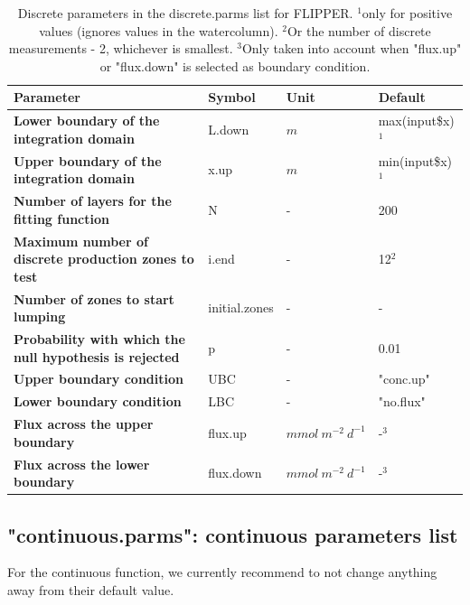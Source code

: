 \documentclass[10pt]{article}
\begin{document}
\begin{table}[!h]
	\small
	\caption{Discrete parameters in the discrete.parms list for FLIPPER. $^{1}$only for positive values (ignores values in the watercolumn). $^{2}$Or the number of discrete measurements - 2, whichever is smallest. $^{3}$Only taken into account when "flux.up" or "flux.down" is selected as boundary condition.}
	\begin{tabular}{p{8cm} p{1.5cm} p{2cm} p{2cm}}
		\hline
		\textbf{Parameter} & \textbf{Symbol} & \textbf{Unit} & \textbf{Default} \\     
		 \hline
		\textbf{Lower boundary of the integration domain } & L.down & $m$ & max(input\$x)$^{1}$  \\
        \textbf{Upper boundary of the integration domain} & x.up & $m$ & min(input\$x)$^{1}$  \\	
        \textbf{Number of layers for the fitting function} & N & - & 200  \\	
        \textbf{Maximum number of discrete production zones to test} & i.end & - & 12$^{2}$  \\	
        \textbf{Number of zones to start lumping } & initial.zones & - & -  \\	
        \textbf{Probability with which the null hypothesis is rejected} & p & - & 0.01  \\	
        \textbf{Upper boundary condition} & UBC & - & "conc.up"  \\	
        \textbf{Lower boundary condition} & LBC & - & "no.flux"  \\	
        \textbf{Flux across the upper boundary} & flux.up & $mmol \: m^{-2} \: d^{-1}$ & -$^{3}$   \\
        \textbf{Flux across the lower boundary} & flux.down & $mmol \: m^{-2} \: d^{-1}$ & -$^{3}$  \\
		\hline
	\end{tabular}
	\label{table_discreteparms}
\end{table}

\subsection{"continuous.parms": continuous parameters list}
For the continuous function, we currently recommend to not change anything away from their default value.
\end{document}
